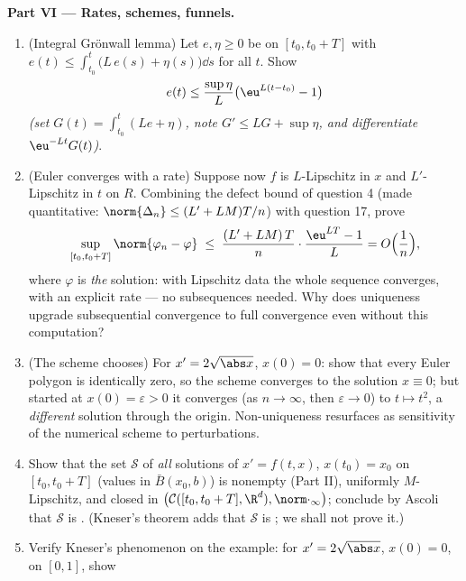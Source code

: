 \begin{problem}[{Weekend problem --- existence of solutions of
$x' = f(t, x)$ without Lipschitz}]
\medskip
\noindent\textbf{Part VI --- Rates, schemes, funnels.}
\begin{enumerate}[resume]
  \item (Integral Gr\"onwall lemma) Let $e, \eta \geq 0$ be
         on $[t_0, t_0+T]$ with $e(t) \leq \int_{t_0}
        ^t\bigl(L\,e(s) + \eta(s)\bigr)\dd s$ for all $t$. Show
        \[
        e(t) \leq \frac{\sup\eta}{L}\bigl(\eu^{L(t - t_0)} -
        1\bigr)
        \]
        \emph{(set $G(t) = \int_{t_0}^t(Le + \eta)$, note $G'
        \leq LG + \sup\eta$, and differentiate
        $\eu^{-Lt}G(t)$)}.
  \item (Euler converges with a rate) Suppose now $f$ is
        $L$-Lipschitz in $x$ and $L'$-Lipschitz in $t$ on $R$.
        Combining the defect bound of question 4 (made
        quantitative: $\norm{\Delta_n} \leq (L' + LM)T/n$) with
        question 17, prove
        \[
        \sup_{[t_0, t_0+T]}\norm{\varphi_n - \varphi}
        \;\leq\; \frac{(L' + LM)\,T}{n}\cdot
        \frac{\eu^{LT} - 1}{L} = O\Bigl(\frac1n\Bigr),
        \]
        where $\varphi$ is \emph{the} solution: with Lipschitz
        data the whole sequence converges, with an explicit
        rate --- no subsequences needed. Why does uniqueness
        upgrade subsequential convergence to full convergence
        even without this computation?
  \item (The scheme chooses) For $x' = 2\sqrt{\abs x}$, $x(0) =
        0$: show that every Euler polygon is identically zero,
        so the scheme converges to the solution $x \equiv 0$;
        but started at $x(0) = \varepsilon > 0$ it converges
        (as $n \to \infty$, then $\varepsilon \to 0$) to $t
        \mapsto t^2$, a \emph{different} solution through the
        origin. Non-uniqueness resurfaces as sensitivity of the
        numerical scheme to perturbations.
  \item Show that the set $\mathcal S$ of \emph{all} solutions
        of $x' = f(t,x)$, $x(t_0) = x_0$ on $[t_0, t_0+T]$
        (values in $\bar B(x_0, b)$) is nonempty (Part II),
        uniformly $M$-Lipschitz, and closed in
        $\bigl(\mathcal C([t_0, t_0+T], \R^d),
        \norm\cdot_\infty\bigr)$; conclude by Ascoli that
        $\mathcal S$ is \emph{}. (Kneser's theorem adds
        that $\mathcal S$ is ; we shall not prove
        it.)
  \item Verify Kneser's phenomenon on the example: for $x' =
        2\sqrt{\abs x}$, $x(0) = 0$, on $[0, 1]$, show

\end{enumerate}
\end{problem}
